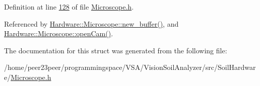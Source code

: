 Definition at line \hyperlink{_microscope_8h_source_l00128}{128} of file \hyperlink{_microscope_8h_source}{Microscope.\+h}.



Referenced by \hyperlink{_microscope_8cpp_source_l00413}{Hardware\+::\+Microscope\+::new\+\_\+buffer()}, and \hyperlink{_microscope_8cpp_source_l00167}{Hardware\+::\+Microscope\+::open\+Cam()}.



The documentation for this struct was generated from the following file\+:\begin{DoxyCompactItemize}
\item 
/home/peer23peer/programmingspace/\+V\+S\+A/\+Vision\+Soil\+Analyzer/src/\+Soil\+Hardware/\hyperlink{_microscope_8h}{Microscope.\+h}\end{DoxyCompactItemize}
